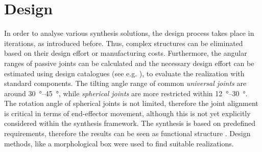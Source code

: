\documentclass[runningheads,hidelinks]{llncs}
\begin{document}
\section{Design}\label{sec:design}
%
%
In order to analyse various synthesis solutions, the design process takes place in iterations, as introduced before. 
Thus, complex structures can be eliminated based on their design effort or manufacturing costs.
Furthermore, the angular ranges of passive joints can be calculated and the necessary design effort can be estimated using design catalogues (see e.g. \cite{StechertFraVie2010}), to evaluate the realization with standard components.
The tilting angle range of common \emph{universal joints} are around \SI{30}{\degree}--\SI{45}{\degree}, while \emph{spherical joints} are more restricted within \SI{12}{\degree}--\SI{30}{\degree}. %
The rotation angle of spherical joints is not limited, therefore the joint alignment is critical in terms of end-effector movement, although this is not yet explicitly considered within the synthesis framework.
The synthesis is based on predefined requirements, therefore the results can be seen as functional structure \cite{Neugebauer.2006}. 
Design methods, like a morphological box were used to find suitable realizations.
\end{document}
